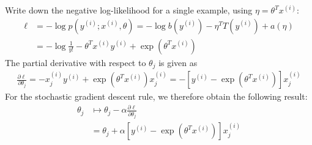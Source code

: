 \begin{answer}
Write down the negative log-likelihood for a single example, using $\eta=\theta^Tx^{(i)}$:
\begin{align*}
    \ell &= - \log p(y^{(i)};x^{(i)},\theta) = -\log b(y^{(i)}) - \eta^T T(y^{(i)}) + a(\eta) \\
         &= - \log\frac{1}{y!} - \theta^T x^{(i)} y^{(i)} + \exp(\theta^T x^{(i)})
\end{align*}
The partial derivative with respect to $\theta_j$ is given as
\begin{align*}
\frac{\partial\ell}{\partial\theta_j} = - x^{(i)}_j y^{(i)} + \exp(\theta^T x^{(i)}) x^{(i)}_j = - \left[y^{(i)} - \exp(\theta^T x^{(i)})\right]x^{(i)}_j
\end{align*}
For the stochastic gradient descent rule, we therefore obtain the following result:
\begin{align*}
    \theta_j &\mapsto \theta_j - \alpha\frac{\partial\ell}{\partial\theta_j} \\
             &= \theta_j + \alpha\left[y^{(i)}-\exp(\theta^T x^{(i)})\right]x^{(i)}_j
\end{align*}
\end{answer}
